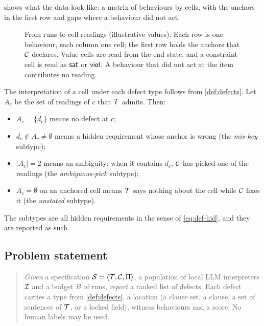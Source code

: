  shows what the data look like: a matrix of behaviours by cells, with the anchors in the first row and gaps where a behaviour did not act.

\begin{figure}[t]
\centering
\resizebox{0.95\textwidth}{!}{}
\caption{From runs to cell readings (illustrative values). Each row is one behaviour, each column one cell; the first row holds the anchors that $\mathcal{C}$ declares. Value cells are read from the end state, and a constraint cell is read as $\textsf{sat}$ or $\textsf{viol}$. A behaviour that did not act at the item contributes no reading.}
\label{fig:cells}
\end{figure}

The interpretation of a cell under each defect type follows from \cref{def:defects}. Let $A_c$ be the set of readings of $c$ that $\mathcal{T}$ admits. Then:
\begin{itemize}[leftmargin=*]
\item $A_c=\{d_c\}$ means no defect at $c$;
\item $d_c\notin A_c\neq\emptyset$ means a hidden requirement whose anchor is wrong (the \emph{mis-key} subtype);
\item $|A_c|=2$ means an ambiguity; when it contains $d_c$, $\mathcal{C}$ has picked one of the readings (the \emph{ambiguous-pick} subtype);
\item $A_c=\emptyset$ on an anchored cell means $\mathcal{T}$ says nothing about the cell while $\mathcal{C}$ fixes it (the \emph{unstated} subtype).
\end{itemize}
The subtypes are all hidden requirements in the sense of \eqref{eq:def-hid}, and they are reported as such.

\subsection{Problem statement}

\begin{quote}
\emph{Given} a specification $\mathcal{S}=\langle\mathcal{T},\mathcal{C},\Pi\rangle$, a population of local LLM interpreters $\mathcal{I}$ and a budget $B$ of runs, \emph{report} a ranked list of defects. Each defect carries a type from \cref{def:defects}, a location (a clause set, a clause, a set of sentences of $\mathcal{T}$, or a locked field), witness behaviours and a score. No human labels may be used.
\end{quote}

